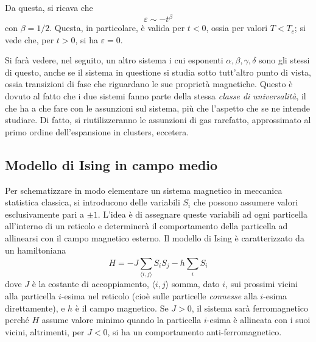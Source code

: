 \documentclass[11pt, a4paper]{scrartcl}
\theoremstyle{style}
\theoremstyle{style1}
\numberwithin{equation}{subsection}
\begin{document}
\begin{enumerate}[(1).]
\begin{center}
\begin{minipage}
			\end{minipage}
		\end{center}
Da questa, si ricava che 
\[
\varepsilon \sim -t ^{\beta }
\] 
con $\beta  = 1 / 2$. 
Questa, in particolare, \`e valida per $t<0$, ossia per valori $T<T_c$; si vede che, per $t>0$, si ha $\varepsilon = 0$.
\end{enumerate}
Si far\`a vedere, nel seguito, un altro sistema i cui esponenti $\alpha ,\beta ,\gamma, \delta $ sono gli stessi di questo, anche se il sistema in questione si studia sotto tutt'altro punto di vista, ossia transizioni di fase che riguardano le sue propriet\`a magnetiche.
Questo \`e dovuto al fatto che i due sistemi fanno parte della stessa \textit{classe di universalit\`a}, il che ha a che fare con le assunzioni sul sistema, pi\`u che l'aspetto che se ne intende studiare.
Di fatto, si riutilizzeranno le assunzioni di gas rarefatto, approssimato al primo ordine dell'espansione in clusters, eccetera.
\subsection{Modello di Ising in campo medio}
Per schematizzare in modo elementare un sistema magnetico in meccanica statistica classica, si introducono delle variabili $S_i$ che possono assumere valori esclusivamente pari a $\pm 1$.
L'idea \`e di assegnare queste variabili ad ogni particella all'interno di un reticolo e determiner\`a il comportamento della particella ad allinearsi con il campo magnetico esterno.
Il modello di Ising \`e caratterizzato da un hamiltoniana 
\[
H = - J \sum_{\langle i,j \rangle}^{} S_iS_j - h \sum_{i}^{} S_i
\] 
dove $J$ \`e la costante di accoppiamento, $\langle i,j \rangle$ somma, dato $i$, sui prossimi vicini alla particella $i$-esima nel reticolo (cio\`e sulle particelle \textit{connesse} alla $i$-esima direttamente), e $h$ \`e il campo magnetico.
Se $J>0$, il sistema sar\`a ferromagnetico perch\'e $H$ assume valore minimo quando la particella $i$-esima \`e allineata con i suoi vicini, altrimenti, per $J<0$, si ha un comportamento anti-ferromagnetico. 
\end{document}
